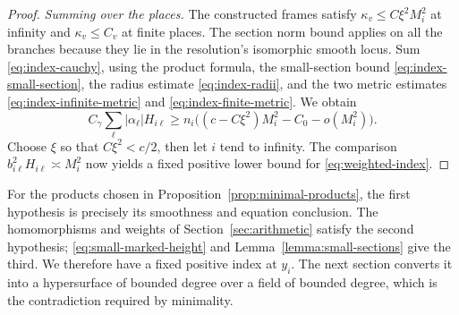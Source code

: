\begin{proof}
\emph{Summing over the places.}
The constructed frames satisfy $\kappa_v\le C\xi^2M_i^2$ at infinity
and $\kappa_v\le C_v$ at finite places.  The section norm bound applies
on all the branches because they lie in the resolution's isomorphic
smooth locus.  Sum \eqref{eq:index-cauchy}, using the product formula,
the small-section bound \eqref{eq:index-small-section}, the radius
estimate \eqref{eq:index-radii}, and the two metric estimates
\eqref{eq:index-infinite-metric} and \eqref{eq:index-finite-metric}.  We
obtain
\[
 C_\gamma\sum_\ell|\alpha_\ell|H_{i\ell}
 \ge n_i\bigl((c-C\xi^2)M_i^2-C_0-o(M_i^2)\bigr).
\]
Choose $\xi$ so that $C\xi^2<c/2$, then let $i$ tend to infinity.
The comparison $b_{i\ell}^2H_{i\ell}\asymp M_i^2$ now yields a
fixed positive lower bound for \eqref{eq:weighted-index}.
\end{proof}

For the products chosen in Proposition~\ref{prop:minimal-products},
the first hypothesis is precisely its smoothness and equation
conclusion.  The homomorphisms and weights of
Section~\ref{sec:arithmetic} satisfy the second hypothesis;
\eqref{eq:small-marked-height} and
Lemma~\ref{lemma:small-sections} give the third.  We therefore have
a fixed positive index at $y_i$.  The next section converts it into
a hypersurface of bounded degree over a field of bounded degree,
which is the contradiction required by minimality.
